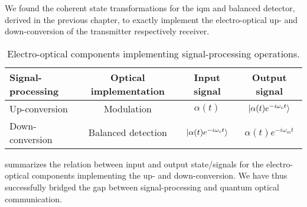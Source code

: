 We found the coherent state transformations for the \gls{iqm} and balanced detector, derived in the previous chapter, to exactly implement the electro-optical up- and down-conversion of the transmitter respectively receiver.
\begin{table}[htb]
  \centering
  \begin{tabular}{lccc}
    \toprule
    Signal-processing & Optical implementation & Input signal & Output signal \\
    \midrule
    Up-conversion & Modulation & $\alpha(t)$ & $\lvert\alpha(t)e^{-i\omega_c t}\rangle$ \\
    Down-conversion & Balanced detection & $\lvert\alpha(t)e^{-i\omega_c t}\rangle$ & $\alpha(t)e^{-i\omega_mt}$ \\
    \bottomrule
  \end{tabular}
  \caption{Electro-optical components implementing signal-processing operations.}\label{tab:electro_optical_signal_processing}
\end{table}
 summarizes the relation between input and output state/signals for the electro-optical components implementing the up- and down-conversion.
We have thus successfully bridged the gap between signal-processing and quantum optical communication.